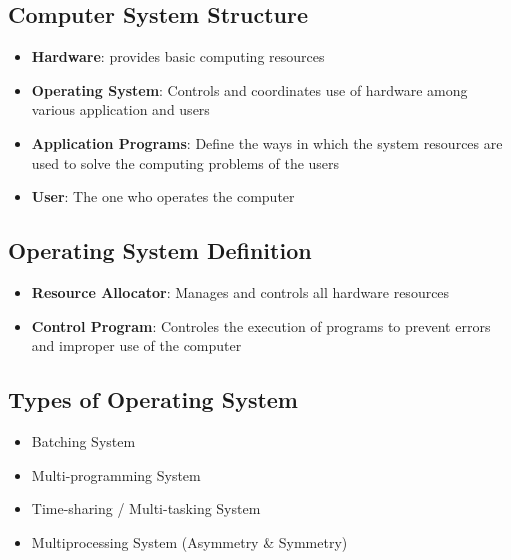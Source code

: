 \documentclass[12pt,titlepage]{article}
\begin{document}
\subsection{Computer System Structure}
\begin{itemize}
    \item \textbf{Hardware}: provides basic computing resources
    \item \textbf{Operating System}: Controls and coordinates use of hardware among various application and users
    \item \textbf{Application Programs}: Define the ways in which the system resources are used to solve the computing problems of the users
    \item \textbf{User}: The one who operates the computer
\end{itemize}

\subsection{Operating System Definition}
\begin{itemize}
    \item \textbf{Resource Allocator}: Manages and controls all hardware resources
    \item \textbf{Control Program}: Controles the execution of programs to prevent errors and improper use of the computer 
\end{itemize}

\subsection{Types of Operating System}
\begin{itemize}
    \item Batching System
    \item Multi-programming System
    \item Time-sharing / Multi-tasking System
    \item Multiprocessing System (Asymmetry \& Symmetry)
\end{itemize}
\end{document}
